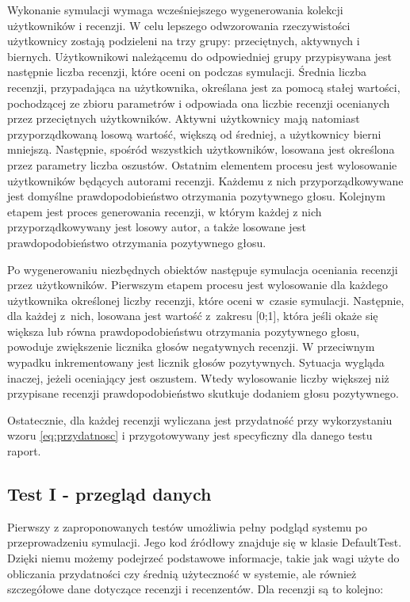 Wykonanie symulacji wymaga wcześniejszego wygenerowania kolekcji użytkowników i recenzji. W celu lepszego odwzorowania rzeczywistości użytkownicy zostają podzieleni na trzy grupy: przeciętnych, aktywnych i biernych. Użytkownikowi należącemu do odpowiedniej grupy przypisywana jest następnie liczba recenzji, które oceni on podczas symulacji. Średnia liczba recenzji, przypadająca na użytkownika, określana jest za pomocą stałej wartości, pochodzącej ze zbioru parametrów i odpowiada ona liczbie recenzji ocenianych przez przeciętnych użytkowników. Aktywni użytkownicy  mają natomiast przyporządkowaną losową wartość, większą od średniej, a użytkownicy bierni mniejszą. Następnie, spośród wszystkich użytkowników, losowana jest określona przez parametry liczba oszustów. Ostatnim elementem procesu jest wylosowanie użytkowników będących autorami recenzji. Każdemu z nich przyporządkowywane jest domyślne prawdopodobieństwo otrzymania pozytywnego głosu. Kolejnym etapem jest proces generowania recenzji, w którym każdej z nich przyporządkowywany jest losowy autor, a także losowane jest prawdopodobieństwo otrzymania pozytywnego głosu.

Po wygenerowaniu niezbędnych obiektów następuje symulacja oceniania recenzji przez użytkowników. Pierwszym etapem procesu jest wylosowanie dla każdego użytkownika określonej liczby recenzji, które oceni w~czasie symulacji. Następnie, dla każdej z~nich, losowana jest wartość z~zakresu [0;1], która jeśli okaże się większa lub równa prawdopodobieństwu otrzymania pozytywnego głosu, powoduje zwiększenie licznika głosów negatywnych recenzji. W przeciwnym wypadku inkrementowany jest licznik głosów pozytywnych. Sytuacja wygląda inaczej, jeżeli oceniający jest oszustem. Wtedy wylosowanie liczby większej niż przypisane recenzji prawdopodobieństwo skutkuje dodaniem głosu pozytywnego. 

Ostatecznie, dla każdej recenzji wyliczana jest przydatność przy wykorzystaniu wzoru \ref{eq:przydatnosc} i przygotowywany jest specyficzny dla danego testu raport.

\subsection{Test I - przegląd danych}

Pierwszy z zaproponowanych testów umożliwia pełny podgląd systemu po przeprowadzeniu symulacji. Jego kod źródłowy znajduje się w klasie DefaultTest. Dzięki niemu możemy podejrzeć podstawowe informacje, takie jak wagi użyte do obliczania przydatności czy średnią użyteczność w systemie, ale również szczegółowe dane dotyczące recenzji i recenzentów. Dla recenzji są to kolejno:

